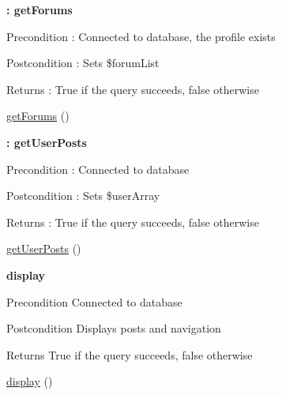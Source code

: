 \begin{Indent}{\bf \+: get\+Forums}\par
{\em \begin{DoxyPrecond}{Precondition}
\+: Connected to database, the profile exists 
\end{DoxyPrecond}
\begin{DoxyPostcond}{Postcondition}
\+: Sets \$forum\+List 
\end{DoxyPostcond}
\begin{DoxyReturn}{Returns}
\+: True if the query succeeds, false otherwise 
\end{DoxyReturn}
}\begin{DoxyCompactItemize}
\item 
\hyperlink{class_main_feed_driver_a733545ee66c218ec32aee1d2a084fe5f}{get\+Forums} ()
\end{DoxyCompactItemize}
\end{Indent}
\begin{Indent}{\bf \+: get\+User\+Posts}\par
{\em \begin{DoxyPrecond}{Precondition}
\+: Connected to database 
\end{DoxyPrecond}
\begin{DoxyPostcond}{Postcondition}
\+: Sets \$user\+Array 
\end{DoxyPostcond}
\begin{DoxyReturn}{Returns}
\+: True if the query succeeds, false otherwise 
\end{DoxyReturn}
}\begin{DoxyCompactItemize}
\item 
\hyperlink{class_main_feed_driver_a3351d7fa14181c0a360f1a3817d03c8b}{get\+User\+Posts} ()
\end{DoxyCompactItemize}
\end{Indent}
\begin{Indent}{\bf display}\par
{\em \begin{DoxyPrecond}{Precondition}
Connected to database 
\end{DoxyPrecond}
\begin{DoxyPostcond}{Postcondition}
Displays posts and navigation 
\end{DoxyPostcond}
\begin{DoxyReturn}{Returns}
True if the query succeeds, false otherwise 
\end{DoxyReturn}
}\begin{DoxyCompactItemize}
\item 
\hyperlink{class_main_feed_driver_a0b9b6e6acd4a839fc7c2f26f96b5cfa8}{display} ()
\end{DoxyCompactItemize}
\end{Indent}


